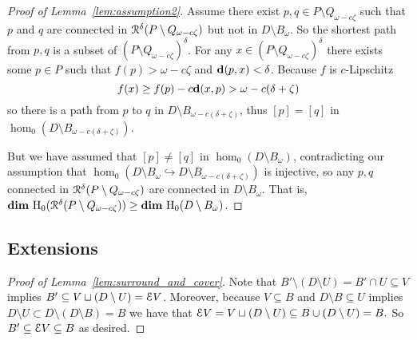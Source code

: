 \begin{proof}[Proof of Lemma~\ref{lem:assumption2}]
  Assume there exist $p,q \in P\setminus Q_{\omega-c\zeta}$ such that $p$ and $q$ are connected in $\mathcal{R}^\delta(P\setminus Q_{\omega-c\zeta})$ but not in $D\setminus B_\omega$.
  So the shortest path from $p, q$ is a subset of $(P\setminus Q_{\omega-c\zeta})^\delta$.
  For any $x\in (P\setminus Q_{\omega-c\zeta})^\delta$ there exists some $p\in P$ such that $f(p) > \omega - c\zeta$ and $\mathbf{d}(p,x) < \delta$.
  Because $f$ is $c$-Lipschitz
  \[ f(x)\geq f(p) - c\mathbf{d}(x,p) > \omega - c(\delta+\zeta)\]
  so there is a path from $p$ to $q$ in $D\setminus B_{\omega-c(\delta+\zeta)}$, thus $[p] = [q]$ in $\hom_0(D\setminus B_{\omega-c(\delta+\zeta)})$.

  But we have assumed that $[p]\neq[q]$ in $\hom_0(D\setminus B_\omega)$, contradicting our assumption that $\hom_0(D\setminus B_\omega\hookrightarrow D\setminus B_{\omega-c(\delta+\zeta)})$ is injective, so any $p,q$ connected in $\mathcal{R}^\delta(P\setminus Q_{\omega-c\zeta})$ are connected in $D\setminus B_\omega$.
  That is, $\mathbf{dim}~\mathrm{H}_0(\mathcal{R}^\delta(P\setminus Q_{\omega-c\zeta}))\geq \mathbf{dim}~\mathrm{H}_0(D\setminus B_\omega)$.
\end{proof}

\subsection{Extensions}

\begin{proof}[Proof of Lemma~\ref{lem:surround_and_cover}]
  Note that $B'\setminus (D\setminus U) = B'\cap U\subseteq V$ implies $B'\subseteq V\sqcup(D\setminus U) = \mathcal{E} V$.
  Moreover, because $V\subseteq B$ and $D\setminus B\subseteq U$ implies $D\setminus U \subset D\setminus (D\setminus B) = B$ we have that
  $\mathcal{E} V = V\sqcup (D\setminus U) \subseteq B\cup (D\setminus U) = B.$
  So $B' \subseteq \mathcal{E} V\subseteq B$ as desired.
\end{proof}

